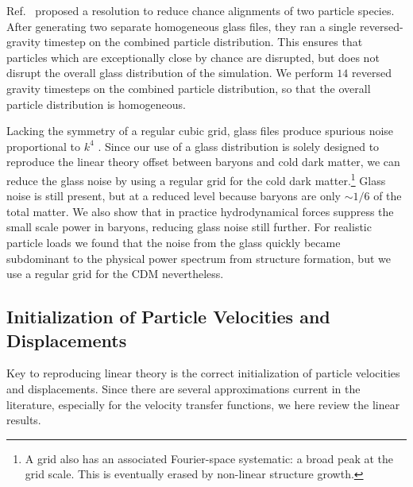 \documentclass[a4paper,11pt]{article}
\newcommand{\YF}[1]{\textcolor{green}{[\bf YF: #1]} }
\begin{document}
Ref.~\cite{Yoshida:2003} proposed a resolution to reduce chance alignments of two particle species. After generating two separate homogeneous glass files, they ran a single reversed-gravity timestep on the combined particle distribution. This ensures that particles which are exceptionally close by chance are disrupted, but does not disrupt the overall glass distribution of the simulation. We perform $14$ reversed gravity timesteps on the combined particle distribution, so that the overall particle distribution is homogeneous.

Lacking the symmetry of a regular cubic grid, glass files produce spurious noise proportional to $k^4$ \cite{Peebles:1993}. Since our use of a glass distribution is solely designed to reproduce the linear theory offset between baryons and cold dark matter, we can reduce the glass noise by using a regular grid for the cold dark matter.\footnote{A grid also has an associated Fourier-space systematic: a broad peak at the grid scale. This is eventually erased by non-linear structure growth.} Glass noise is still present, but at a reduced level because baryons are only $\sim 1/6$ of the total matter. We also show that in practice hydrodynamical forces suppress the small scale power in baryons, reducing glass noise still further. For realistic particle loads we found that the noise from the glass quickly became subdominant to the physical power spectrum from structure formation, but we use a regular grid for the CDM nevertheless.


\subsection{Initialization of Particle Velocities and Displacements}
\label{sec:particles}

Key to reproducing linear theory is the correct initialization of particle velocities and displacements. Since there are several approximations current in the literature, especially for the velocity transfer functions, we here review the linear results.
\end{document}
